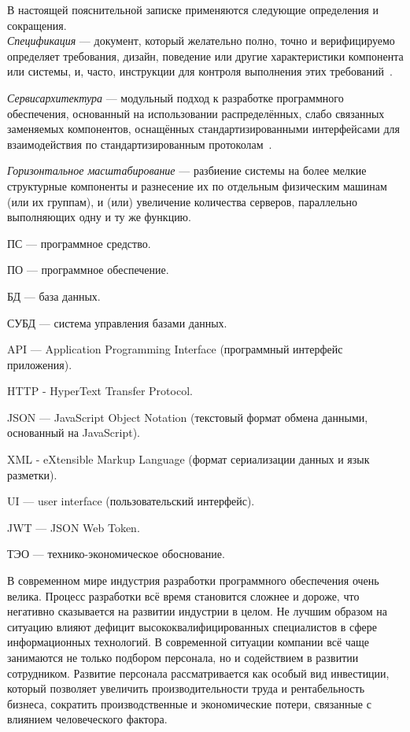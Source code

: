 \label{sec:definitions}
\label{sec:introduction}

В настоящей пояснительной записке применяются следующие определения и сокращения.
\\

\emph{Спецификация} — документ, который желательно полно, точно и верифицируемо определяет требования, дизайн, поведение или другие характеристики компонента или системы, и, часто, инструкции для контроля выполнения этих требований~\cite{istqb_specification}.

\emph{Сервис архитектура} — модульный подход к разработке программного обеспечения, основанный на использовании распределённых, слабо связанных заменяемых компонентов, оснащённых стандартизированными интерфейсами для взаимодействия по стандартизированным протоколам~\cite{wiki_soa}.

\emph{Горизонтальное масштабирование} — разбиение системы на более мелкие структурные компоненты и разнесение их по отдельным физическим машинам (или их группам), и (или) увеличение количества серверов, параллельно выполняющих одну и ту же функцию.

ПС — программное средство.

ПО — программное обеспечение.

БД — база данных.

СУБД — система управления базами данных.

API — Application Programming Interface (программный интерфейс приложения).

HTTP - HyperText Transfer Protocol.

JSON — JavaScript Object Notation (текстовый формат обмена данными, основанный на JavaScript).

XML - eXtensible Markup Language (формат сериализации данных и язык разметки).

UI — user interface (пользовательский интерфейс).

JWT — JSON Web Token.

ТЭО — технико-экономическое обоснование.

\newpage

\label{sec:introduction}

В современном мире индустрия разработки программного обеспечения очень велика. Процесс разработки всё время становится сложнее и дороже, что негативно сказывается на развитии индустрии в целом. Не лучшим образом на ситуацию влияют дефицит высококвалифицированных специалистов в сфере информационных технологий. В современной ситуации компании всё чаще занимаются не только подбором персонала, но и содействием в развитии сотрудником. Развитие персонала рассматривается как особый вид инвестиции, который позволяет увеличить производительности труда и рентабельность бизнеса, сократить производственные и экономические потери, связанные с влиянием человеческого фактора.

